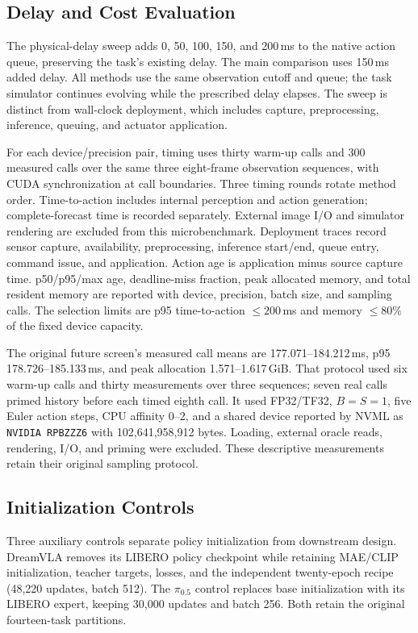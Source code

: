 \subsection{Delay and Cost Evaluation}
The physical-delay sweep adds 0, 50, 100, 150, and 200\,ms to the native
action queue, preserving the task's existing delay. The main comparison
uses 150\,ms added delay. All methods use the same observation cutoff and
queue; the task simulator continues evolving while the prescribed delay
elapses. The sweep is distinct from wall-clock deployment, which includes
capture, preprocessing, inference, queuing, and actuator application.



For each device/precision pair, timing uses thirty warm-up calls and 300
measured calls over the same three eight-frame observation sequences,
with CUDA synchronization at call boundaries. Three timing rounds rotate
method order. Time-to-action includes internal perception and action
generation; complete-forecast time is recorded separately. External image
I/O and simulator rendering are excluded from this microbenchmark.
Deployment traces record sensor capture, availability, preprocessing,
inference start/end, queue entry, command issue, and application.
Action age is application minus source capture time. p50/p95/max age,
deadline-miss fraction, peak allocated memory, and total resident memory
are reported with device, precision, batch size, and sampling calls.
The selection limits are p95 time-to-action $\leq200$\,ms and memory
$\leq80\%$ of the fixed device capacity.

The original future screen's measured call means are
177.071--184.212\,ms, p95 178.726--185.133\,ms, and peak allocation
1.571--1.617\,GiB. That protocol used six warm-up calls and thirty measurements
over three sequences; seven real calls primed history before each timed
eighth call. It used FP32/TF32, $B=S=1$, five Euler action steps, CPU
affinity 0--2, and a shared device reported by NVML as
\texttt{NVIDIA RPBZZZ6} with 102,641,958,912 bytes. Loading, external
oracle reads, rendering, I/O, and priming were excluded. These descriptive
measurements retain their original sampling protocol.

\subsection{Initialization Controls}
Three auxiliary controls separate policy initialization from downstream
design. DreamVLA removes its LIBERO policy checkpoint while retaining
MAE/CLIP initialization, teacher targets, losses, and the independent
twenty-epoch recipe (48,220 updates, batch 512). The $\pi_{0.5}$ control
replaces base initialization with its LIBERO expert, keeping 30,000 updates
and batch 256. Both retain the original fourteen-task partitions.

